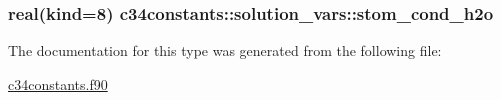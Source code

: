 \subsubsection[{\texorpdfstring{stom\+\_\+cond\+\_\+h2o}{stom_cond_h2o}}]{\setlength{\rightskip}{0pt plus 5cm}real(kind=8) c34constants\+::solution\+\_\+vars\+::stom\+\_\+cond\+\_\+h2o}\hypertarget{structc34constants_1_1solution__vars_af8670de0f15d89016b814037183ece8e}{}\label{structc34constants_1_1solution__vars_af8670de0f15d89016b814037183ece8e}


The documentation for this type was generated from the following file\+:\begin{DoxyCompactItemize}
\item 
\hyperlink{c34constants_8f90}{c34constants.\+f90}\end{DoxyCompactItemize}
